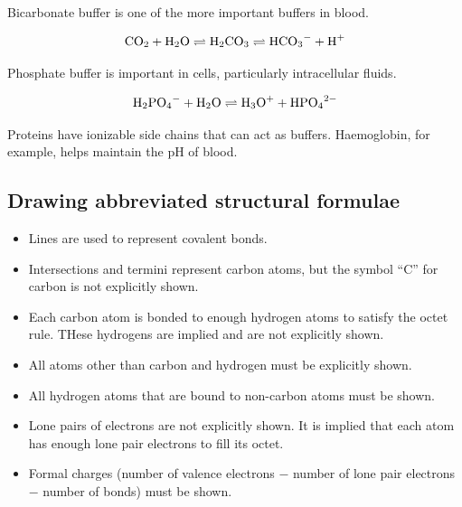 \documentclass[letterpaper, 12pt]{article}
\begin{document}
Bicarbonate buffer is one of the more important buffers in blood.

$$\ce{CO2} + \ce{H2O} \rightleftharpoons \ce{H2CO3} \rightleftharpoons \ce{HCO3-} + \ce{H+}$$

Phosphate buffer is important in cells, particularly intracellular fluids.

$$\ce{H2PO4-} + \ce{H2O} \rightleftharpoons \ce{H3O+} + \ce{HPO4^2-}$$

Proteins have ionizable side chains that can act as buffers. Haemoglobin, for example, helps maintain the pH of blood.

\subsection*{Drawing abbreviated structural formulae}

\begin{itemize}
\item Lines are used to represent covalent bonds.
\item Intersections and termini represent carbon atoms, but the symbol ``C'' for carbon is not explicitly shown.
\item Each carbon atom is bonded to enough hydrogen atoms to satisfy the octet rule. THese hydrogens are implied and are not explicitly shown.
\item All atoms other than carbon and hydrogen must be explicitly shown. 
\item All hydrogen atoms that are bound to non-carbon atoms must be shown.
\item Lone pairs of electrons are not explicitly shown. It is implied that each atom has enough lone pair electrons to fill its octet.
\item Formal charges (number of valence electrons $-$ number of lone pair electrons $-$ number of bonds) must be shown. 
\end{itemize}
\end{document}
